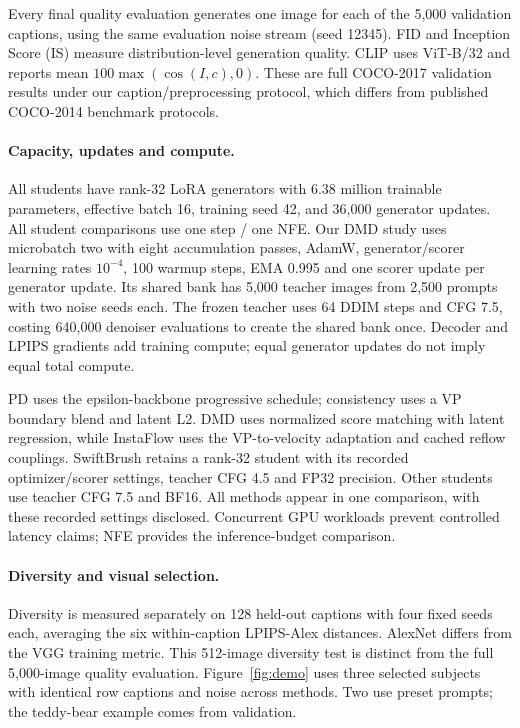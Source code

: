 \documentclass[10pt,twocolumn,letterpaper]{article}
\begin{document}
Every final quality evaluation generates one image for each of the 5,000
validation captions, using the same evaluation noise stream (seed 12345).
FID and Inception Score (IS) measure distribution-level generation quality.
CLIP uses ViT-B/32 and reports mean $100\max(\cos(I,c),0)$. These are
full COCO-2017 validation results under our caption/preprocessing protocol,
which differs from published COCO-2014 benchmark protocols.

\paragraph{Capacity, updates and compute.}
All students have rank-32 LoRA generators with 6.38 million trainable
parameters, effective batch 16, training seed 42, and 36,000
generator updates. All student comparisons use one step / one NFE.
Our DMD study uses microbatch two with eight accumulation passes, AdamW,
generator/scorer learning rates $10^{-4}$, 100 warmup steps, EMA 0.995 and
one scorer update per generator update. Its shared bank has 5,000 teacher
images from 2,500 prompts with two noise seeds each. The frozen teacher uses
64 DDIM steps and CFG 7.5, costing 640,000 denoiser evaluations to create
the shared bank once. Decoder and LPIPS gradients add training compute;
equal generator updates do not imply equal total compute.

PD uses the epsilon-backbone progressive schedule; consistency uses a VP
boundary blend and latent L2. DMD uses normalized score matching with latent
regression, while InstaFlow uses the VP-to-velocity adaptation and cached
reflow couplings. SwiftBrush retains a rank-32 student with its recorded
optimizer/scorer settings, teacher CFG 4.5 and FP32 precision. Other students
use teacher CFG 7.5 and BF16. All methods appear in one comparison, with
these recorded settings disclosed. Concurrent GPU workloads prevent controlled latency claims; NFE
provides the inference-budget comparison.

\paragraph{Diversity and visual selection.}
Diversity is measured separately on 128 held-out captions with four fixed
seeds each, averaging the six within-caption LPIPS-Alex distances. AlexNet
differs from the VGG training metric. This 512-image diversity test is distinct
from the full 5,000-image quality evaluation. Figure~\ref{fig:demo} uses
three selected subjects with identical row captions and noise across methods.
Two use preset prompts; the teddy-bear example comes from validation.
\end{document}
